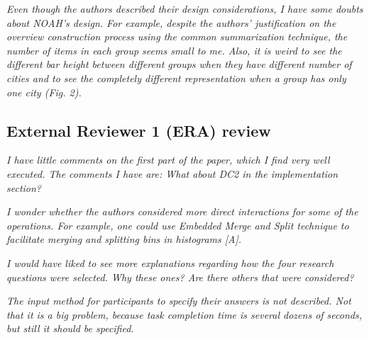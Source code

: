  \textit{Even though the authors described their design considerations, I have some
    doubts about NOAH’s design. For example, despite the authors’ justification on the
    overview construction process using the common summarization technique, the number
    of items in each group seems small to me. Also, it is weird to see the different
    bar height between different groups when they have different number of cities and
    to see the completely different representation when a group has only one city
    (Fig. 2).}
    
  

\subsection*{External Reviewer 1 (ERA) review}
 \textit{I have little comments on the first part of the paper, which I find very well
    executed. The comments I have are: What about DC2 in the implementation section?}
    
 
    
 \textit{I wonder whether the authors considered more direct interactions for some of the
    operations. For example, one could use Embedded Merge and Split technique to
    facilitate merging and splitting bins in histograms [A].}
    
  

 \textit{I would have liked to see more explanations regarding how the four research
    questions were selected. Why these ones? Are there others that were considered?}
    
  
    
 \textit{The input method for participants to specify their answers is not described. Not
    that it is a big problem, because task completion time is several dozens of
    seconds, but still it should be specified.}

  

